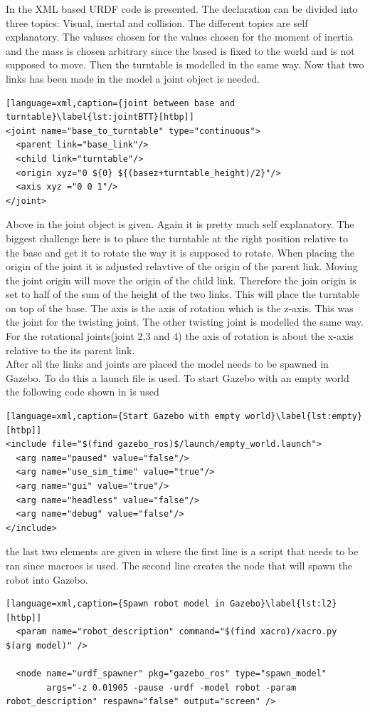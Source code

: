 In  the XML based URDF code is presented. The declaration can be divided into three topics: Visual, inertal and collision. The different topics are self explanatory. The valuses chosen for the values chosen for the moment of inertia and the mass is chosen arbitrary since the based is fixed to the world and is not supposed to move. Then the turntable is modelled in the same way. Now that two links has been made in the model a joint object is needed.

\begin{lstlisting}[language=xml,caption={joint between base and turntable}\label{lst:jointBTT}[htbp]]
<joint name="base_to_turntable" type="continuous">
  <parent link="base_link"/>
  <child link="turntable"/>
  <origin xyz="0 ${0} ${(basez+turntable_height)/2}"/>
  <axis xyz ="0 0 1"/>
</joint>
\end{lstlisting}
 Above in  the joint object is given. Again it is pretty much self explanatory. The biggest challenge here is to place the turntable at the right position relative to the base and get it to rotate the way it is supposed to rotate. When placing the origin of the joint it is adjusted relavtive of the origin of the parent link. Moving the joint origin will move the origin of the child link. Therefore the join origin is set to half of the sum of the height of the two links. This will place the turntable on top of the base. The axis is the axis of rotation which is the z-axis. This was the joint for the twisting joint. The other twisting joint is modelled the same way. For the rotational joints(joint 2,3 and 4) the axis of rotation is about the x-axis relative to the its parent link. \\
 
After all the links and joints are placed the model needs to be spawned in Gazebo. To do this a launch file is used. To start Gazebo with an empty world the following code shown in  is used
\begin{lstlisting}[language=xml,caption={Start Gazebo with empty world}\label{lst:empty}[htbp]]
<include file="$(find gazebo_ros)$/launch/empty_world.launch">
  <arg name="paused" value="false"/>
  <arg name="use_sim_time" value="true"/>
  <arg name="gui" value="true"/>
  <arg name="headless" value="false"/>
  <arg name="debug" value="false"/>
</include>
\end{lstlisting}
the last two elements are given in  where the first line is a script that needs to be ran since macroes is used. The second line creates the node that will spawn the robot into Gazebo. 
\begin{lstlisting}[language=xml,caption={Spawn robot model in Gazebo}\label{lst:l2}[htbp]]
  <param name="robot_description" command="$(find xacro)/xacro.py $(arg model)" />

  <node name="urdf_spawner" pkg="gazebo_ros" type="spawn_model"
        args="-z 0.01905 -pause -urdf -model robot -param robot_description" respawn="false" output="screen" />
\end{lstlisting}